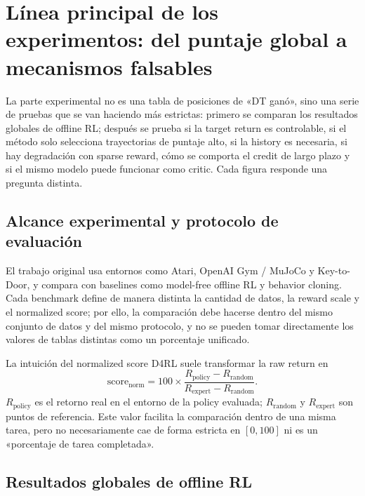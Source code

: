 \section{Línea principal de los experimentos: del puntaje global a mecanismos falsables}

La parte experimental no es una tabla de posiciones de «DT ganó», sino una serie de pruebas que se van haciendo más estrictas: primero se comparan los resultados globales de offline RL; después se prueba si la target return es controlable, si el método solo selecciona trayectorias de puntaje alto, si la history es necesaria, si hay degradación con sparse reward, cómo se comporta el credit de largo plazo y si el mismo modelo puede funcionar como critic. Cada figura responde una pregunta distinta.

\subsection{Alcance experimental y protocolo de evaluación}

El trabajo original usa entornos como Atari, OpenAI Gym / MuJoCo y Key-to-Door, y compara con baselines como model-free offline RL y behavior cloning. Cada benchmark define de manera distinta la cantidad de datos, la reward scale y el normalized score; por ello, la comparación debe hacerse dentro del mismo conjunto de datos y del mismo protocolo, y no se pueden tomar directamente los valores de tablas distintas como un porcentaje unificado.


\begin{knowledgebox}{La intuición del normalized score}
D4RL suele transformar la raw return en
\[
\mathrm{score}_{\mathrm{norm}}
=100\times\frac{R_{\mathrm{policy}}-R_{\mathrm{random}}}
{R_{\mathrm{expert}}-R_{\mathrm{random}}}.
\]
$R_{\mathrm{policy}}$ es el retorno real en el entorno de la policy evaluada; $R_{\mathrm{random}}$ y $R_{\mathrm{expert}}$ son puntos de referencia. Este valor facilita la comparación dentro de una misma tarea, pero no necesariamente cae de forma estricta en $[0,100]$ ni es un «porcentaje de tarea completada».
\end{knowledgebox}

\subsection{Resultados globales de offline RL}

